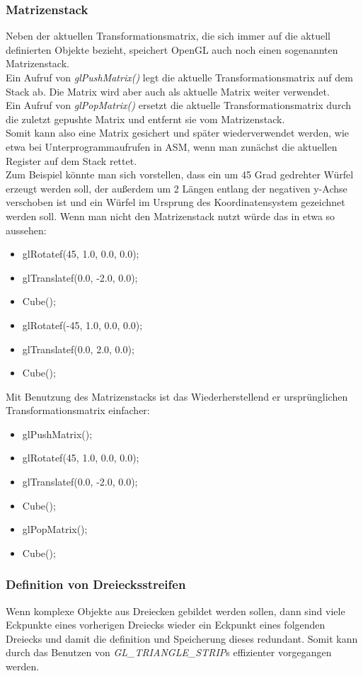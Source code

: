 \subsubsection*{Matrizenstack}
Neben der aktuellen Transformationsmatrix, die sich immer auf die aktuell definierten Objekte bezieht, speichert OpenGL auch noch einen sogenannten Matrizenstack.\\
Ein Aufruf von \textit{glPushMatrix()} legt die aktuelle Transformationsmatrix auf dem Stack ab. Die Matrix wird aber auch als aktuelle Matrix weiter verwendet.\\
Ein Aufruf von \textit{glPopMatrix()} ersetzt die aktuelle Transformationsmatrix durch die zuletzt gepushte Matrix und entfernt sie vom Matrizenstack.\\
Somit kann also eine Matrix gesichert und später wiederverwendet werden, wie etwa bei Unterprogrammaufrufen in ASM, wenn man zunächst die aktuellen Register auf dem Stack rettet.\\
Zum Beispiel könnte man sich vorstellen, dass ein um 45 Grad gedrehter Würfel erzeugt werden soll, der außerdem um 2 Längen entlang der negativen y-Achse verschoben ist und ein Würfel im Ursprung des Koordinatensystem gezeichnet werden soll. Wenn man nicht den Matrizenstack nutzt würde das in etwa so aussehen:
\begin{itemize}
    \item glRotatef(45, 1.0, 0.0, 0.0);
    \item glTranslatef(0.0, -2.0, 0.0);
    \item Cube();
    \item glRotatef(-45, 1.0, 0.0, 0.0);
    \item glTranslatef(0.0, 2.0, 0.0);
    \item Cube();
\end{itemize}
Mit Benutzung des Matrizenstacks ist das Wiederherstellend er ursprünglichen Transformationsmatrix einfacher:
\begin{itemize}
    \item glPushMatrix();
    \item glRotatef(45, 1.0, 0.0, 0.0);
    \item glTranslatef(0.0, -2.0, 0.0);
    \item Cube();
    \item glPopMatrix();
    \item Cube();
\end{itemize}

\subsubsection*{Definition von Dreiecksstreifen}
Wenn komplexe Objekte aus Dreiecken gebildet werden sollen, dann sind viele Eckpunkte eines vorherigen Dreiecks wieder ein Eckpunkt eines folgenden Dreiecks und damit die definition und Speicherung dieses redundant. Somit kann durch das Benutzen von  \textit{GL\_TRIANGLE\_STRIP}s effizienter vorgegangen werden.\\

